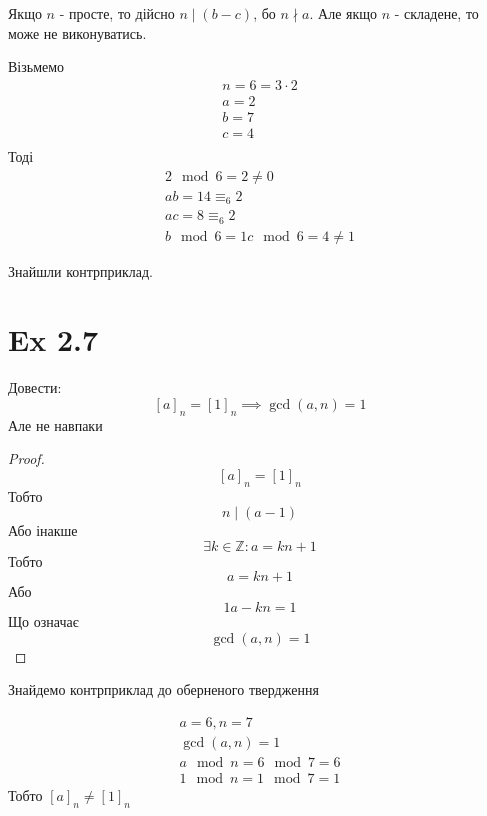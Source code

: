 \documentclass[11pt, a4paper]{article} %
\newcommand{\Z}{\mathbb{Z}}
\begin{document}
Якщо $n$ - просте, то дійсно $n \mid (b-c)$, бо $n \nmid a$.
Але якщо $n$ - складене, то може не виконуватись.

Візьмемо
\begin{gather*}
    n = 6 = 3\cdot 2\\
    a = 2\\
    b = 7\\
    c = 4\\
\end{gather*}
Тоді
\begin{gather*}
    2 \mod 6 = 2 \ne 0\\
    ab = 14 \equiv_6 2\\
    ac = 8 \equiv_6 2\\
    b \mod 6 = 1
    c \mod 6 = 4 \ne 1
\end{gather*}

Знайшли контрприклад. 

\section*{Ex 2.7}
\begin{mdframed}
    Довести:
    \[[a]_n=[1]_n \implies \gcd(a,n)=1\]
    Але не навпаки
\end{mdframed}

\begin{proof}
    \[[a]_n = [1]_n\]
    Тобто
    \[n \mid (a-1) \]
    Або інакше
    \[\exists k\in\Z: a = kn + 1\]
    Тобто
    \[a = kn + 1\]
    Або
    \[1a-kn = 1\]
    Що означає
    \[\gcd(a,n) = 1\]
\end{proof}

Знайдемо контрприклад до оберненого твердження

\begin{gather*}
    a = 6, n = 7\\
    \gcd(a,n) = 1\\
    a \mod n = 6 \mod 7 = 6\\
    1 \mod n = 1 \mod 7 = 1
\end{gather*}
Тобто $[a]_n \ne [1]_n$
\end{document}
